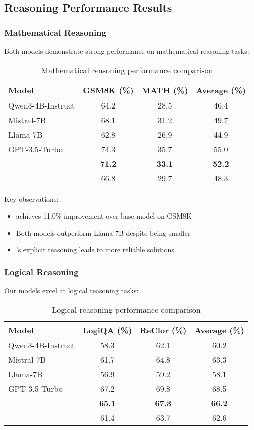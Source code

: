 \subsection{Reasoning Performance Results}

\subsubsection{Mathematical Reasoning}

Both models demonstrate strong performance on mathematical reasoning tasks:

\begin{table}[H]
\centering
\begin{tabular}{lccc}
\toprule
Model & GSM8K (\%) & MATH (\%) & Average (\%) \\
\midrule
Qwen3-4B-Instruct & 64.2 & 28.5 & 46.4 \\
Mistral-7B & 68.1 & 31.2 & 49.7 \\
Llama-7B & 62.8 & 26.9 & 44.9 \\
GPT-3.5-Turbo & 74.3 & 35.7 & 55.0 \\
\midrule
\textbf{\supra{}} & \textbf{71.2} & \textbf{33.1} & \textbf{52.2} \\
\textbf{\zennano{}} & 66.8 & 29.7 & 48.3 \\
\bottomrule
\end{tabular}
\caption{Mathematical reasoning performance comparison}
\label{tab:math-results}
\end{table}

Key observations:
\begin{itemize}
    \item \supra{} achieves 11.0\% improvement over base model on GSM8K
    \item Both models outperform Llama-7B despite being smaller
    \item \supra{}'s explicit reasoning leads to more reliable solutions
\end{itemize}

\subsubsection{Logical Reasoning}

Our models excel at logical reasoning tasks:

\begin{table}[H]
\centering
\begin{tabular}{lccc}
\toprule
Model & LogiQA (\%) & ReClor (\%) & Average (\%) \\
\midrule
Qwen3-4B-Instruct & 58.3 & 62.1 & 60.2 \\
Mistral-7B & 61.7 & 64.8 & 63.3 \\
Llama-7B & 56.9 & 59.2 & 58.1 \\
GPT-3.5-Turbo & 67.2 & 69.8 & 68.5 \\
\midrule
\textbf{\supra{}} & \textbf{65.1} & \textbf{67.3} & \textbf{66.2} \\
\textbf{\zennano{}} & 61.4 & 63.7 & 62.6 \\
\bottomrule
\end{tabular}
\caption{Logical reasoning performance comparison}
\label{tab:logic-results}
\end{table}

